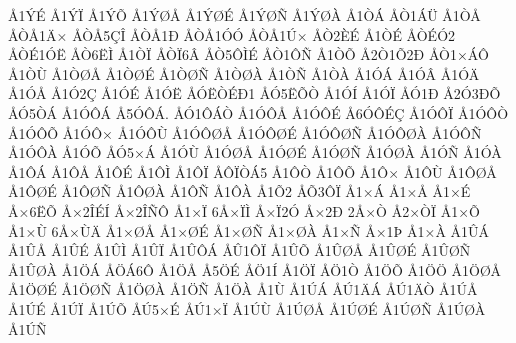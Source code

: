 {^^c51^^dd^^c9
^^c51^^dd^^cf
^^c51^^dd^^d5
^^c51^^dd^^d8^^c5
^^c51^^dd^^d8^^c9
^^c51^^dd^^d8^^d1
^^c51^^dd^^d8^^c0
^^c51^^d2^^c1
^^c5^^d21^^c1^^dc
^^c51^^d2^^c5
^^c5^^d2^^c51^^c4^^d7
^^c5^^d2^^c55^^c7^^ce
^^c5^^d2^^c51^^d0
^^c5^^d2^^c51^^d3^^d3
^^c5^^d2^^c51^^da^^d7
^^c5^^d22^^c8^^c9
^^c51^^d2^^c9
^^c5^^d2^^c9^^d32
^^c5^^d2^^c91^^d3^^cb
^^c5^^d26^^cb^^cc
^^c51^^d2^^cf
^^c5^^d2^^cf6^^c2
^^c5^^d25^^d4^^cc^^c9
^^c5^^d21^^d4^^d1
^^c51^^d2^^d5
^^c52^^d21^^d52^^d0
^^c5^^d21^^d7^^c1^^d4
^^c51^^d2^^d9
^^c51^^d2^^d8^^c5
^^c51^^d2^^d8^^c9
^^c51^^d2^^d8^^d1
^^c51^^d2^^d8^^c0
^^c51^^d2^^d1
^^c51^^d2^^c0
^^c51^^d3^^c1
^^c51^^d3^^c2
^^c51^^d3^^c4
^^c51^^d3^^c5
^^c51^^d32^^c7
^^c51^^d3^^c9
^^c51^^d3^^cb
^^c5^^d3^^cb^^d2^^c9^^d01
^^c5^^d35^^cb^^d5^^d2
^^c51^^d3^^cd
^^c51^^d3^^cf
^^c5^^d31^^d0
^^c52^^d33^^d0^^d5
^^c5^^d35^^d2^^c1
^^c51^^d3^^d4^^c1
^^c55^^d3^^d4^^c1.
^^c5^^d31^^d4^^c1^^d2
^^c51^^d3^^d4^^c5
^^c51^^d3^^d4^^c9
^^c56^^d3^^d4^^c9^^c7
^^c51^^d3^^d4^^cf
^^c51^^d3^^d4^^d2
^^c51^^d3^^d4^^d5
^^c51^^d3^^d4^^d7
^^c51^^d3^^d4^^d9
^^c51^^d3^^d4^^d8^^c5
^^c51^^d3^^d4^^d8^^c9
^^c51^^d3^^d4^^d8^^d1
^^c51^^d3^^d4^^d8^^c0
^^c51^^d3^^d4^^d1
^^c51^^d3^^d4^^c0
^^c51^^d3^^d5
^^c5^^d35^^d7^^c1
^^c51^^d3^^d9
^^c51^^d3^^d8^^c5
^^c51^^d3^^d8^^c9
^^c51^^d3^^d8^^d1
^^c51^^d3^^d8^^c0
^^c51^^d3^^d1
^^c51^^d3^^c0
^^c51^^d4^^c1
^^c51^^d4^^c5
^^c51^^d4^^c9
^^c51^^d4^^cc
^^c51^^d4^^cf
^^c5^^d4^^cf^^d2^^c15
^^c51^^d4^^d2
^^c51^^d4^^d5
^^c51^^d4^^d7
^^c51^^d4^^d9
^^c51^^d4^^d8^^c5
^^c51^^d4^^d8^^c9
^^c51^^d4^^d8^^d1
^^c51^^d4^^d8^^c0
^^c51^^d4^^d1
^^c51^^d4^^c0
^^c51^^d52
^^c5^^d53^^d4^^cf
^^c51^^d7^^c1
^^c51^^d7^^c5
^^c51^^d7^^c9
^^c5^^d76^^cb^^d5
^^c5^^d72^^ce^^c9^^cd
^^c5^^d72^^ce^^d1^^d4
^^c51^^d7^^cf
6^^c5^^d7^^cf^^cc
^^c5^^d7^^cf2^^d3
^^c5^^d72^^d0
2^^c5^^d7^^d2
^^c52^^d7^^d2^^cf
^^c51^^d7^^d5
^^c51^^d7^^d9
6^^c5^^d7^^d9^^c4
^^c51^^d7^^d8^^c5
^^c51^^d7^^d8^^c9
^^c51^^d7^^d8^^d1
^^c51^^d7^^d8^^c0
^^c51^^d7^^d1
^^c5^^d71^^de
^^c51^^d7^^c0
^^c51^^db^^c1
^^c51^^db^^c5
^^c51^^db^^c9
^^c51^^db^^cc
^^c51^^db^^cf
^^c51^^db^^d4^^c1
^^c5^^db1^^d4^^cf
^^c51^^db^^d5
^^c51^^db^^d8^^c5
^^c51^^db^^d8^^c9
^^c51^^db^^d8^^d1
^^c51^^db^^d8^^c0
^^c51^^d6^^c1
^^c5^^d6^^c16^^d4
^^c51^^d6^^c5
^^c55^^d6^^c9
^^c5^^d61^^cd
^^c51^^d6^^cf
^^c5^^d61^^d2
^^c51^^d6^^d5
^^c51^^d6^^d6
^^c51^^d6^^d8^^c5
^^c51^^d6^^d8^^c9
^^c51^^d6^^d8^^d1
^^c51^^d6^^d8^^c0
^^c51^^d6^^d1
^^c51^^d6^^c0
^^c51^^d9
^^c51^^da^^c1
^^c5^^da1^^c4^^c1
^^c5^^da1^^c4^^d2
^^c51^^da^^c5
^^c51^^da^^c9
^^c51^^da^^cf
^^c51^^da^^d5
^^c5^^da5^^d7^^c9
^^c5^^da1^^d7^^cf
^^c51^^da^^d9
^^c51^^da^^d8^^c5
^^c51^^da^^d8^^c9
^^c51^^da^^d8^^d1
^^c51^^da^^d8^^c0
^^c51^^da^^d1
}
